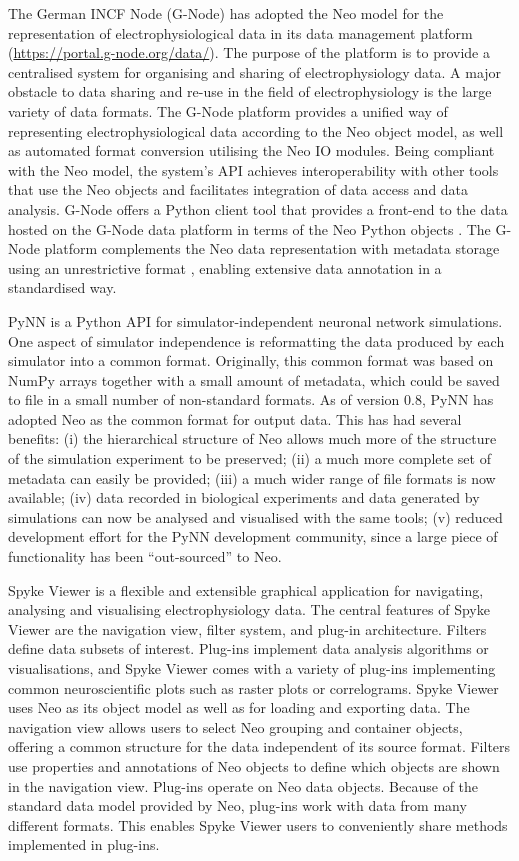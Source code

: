 \documentclass{frontiers}
\begin{document}
The German INCF Node (G-Node) has adopted the Neo model for the representation of electrophysiological data in its data management platform (\url{https://portal.g-node.org/data/}).
The purpose of the platform is to provide a centralised system for organising and sharing of electrophysiology data.
A major obstacle to data sharing and re-use in the field of electrophysiology is the large variety of data formats.
The G-Node platform provides a unified way of representing electrophysiological data according to the Neo object model, as well as automated format conversion utilising the Neo IO modules.
Being compliant with the Neo model, the system's API achieves interoperability with other tools that use the Neo objects and facilitates integration of data access and data analysis.
G-Node offers a Python client tool that provides a front-end to the data hosted on the G-Node data platform in terms of the Neo Python objects \citep{Sobolev2014}.
The G-Node platform complements the Neo data representation with metadata storage using an unrestrictive format \citep{Grewe2011}, enabling extensive data annotation in a standardised way.

PyNN \citep{Davison2009} is a Python API for simulator-independent neuronal network simulations.
One aspect of simulator independence is reformatting the data produced by each simulator into a common format.
Originally, this common format was based on NumPy arrays together with a small amount of metadata, which could be saved to file in a small number of non-standard formats.
As of version 0.8, PyNN has adopted Neo as the common format for output data.
This has had several benefits:
  (i)   the hierarchical structure of Neo allows much more of the structure of the simulation experiment to be preserved;
  (ii)  a much more complete set of metadata can easily be provided;
  (iii) a much wider range of file formats is now available;
  (iv)  data recorded in biological experiments and data generated by simulations can now be analysed and visualised with the same tools; 
  (v)   reduced development effort for the PyNN development community, since a large piece of functionality has been ``out-sourced'' to Neo.

Spyke Viewer \citep{Proepper2013} is a flexible and extensible graphical application for navigating, analysing and visualising electrophysiology data. 
The central features of Spyke Viewer are the navigation view, filter system, and plug-in architecture.
Filters define data subsets of interest.
Plug-ins implement data analysis algorithms or visualisations, and Spyke Viewer comes with a variety of plug-ins implementing common neuroscientific plots such as raster plots or correlograms.
Spyke Viewer uses Neo as its object model as well as for loading and exporting data. 
The navigation view allows users to select Neo grouping and container objects, offering a common structure for the data independent of its source format.
Filters use properties and annotations of Neo objects to define which objects are shown in the navigation view.
Plug-ins operate on Neo data objects. Because of the standard data model provided by Neo, plug-ins work with data from many different formats. This enables Spyke Viewer users to conveniently share methods implemented in plug-ins.
\end{document}
